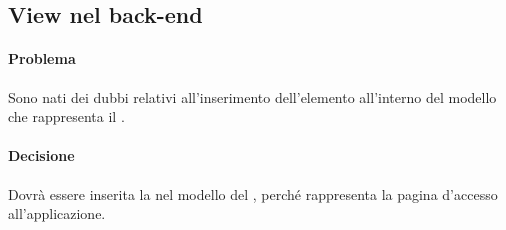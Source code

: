 \subsection{View nel back-end}
\paragraph{Problema}
Sono nati dei dubbi relativi all'inserimento dell'elemento  all'interno del modello che rappresenta il .
\paragraph{Decisione}
Dovrà essere inserita la  nel modello del , perché rappresenta la pagina d'accesso all'applicazione.
